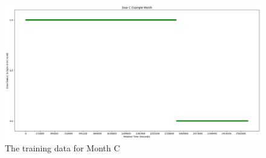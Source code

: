   \begin{figure}[!htb]
    \centering
    \includegraphics[width=\linewidth]{images/Door_C_Example_Month.png}
    \caption{The training data for Month C}
    \label{figure:Door C Training Month}
  \end{figure}

